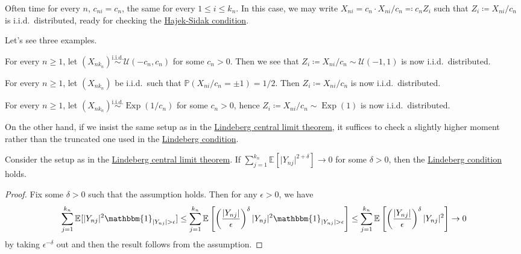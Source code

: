 \begin{intuition}
	Often time for every \(n\), \(c_{ni} = c_n\), the same for every \(1 \leq i \leq k_n\). In this case, we may write \(X_{n i} = c_n \cdot X_{ni} / c_n \eqqcolon c_n Z_i\) such that \(Z_i \coloneqq X_{ni} / c_n\) is i.i.d.\ distributed, ready for checking the \hyperref[thm:Hajek-Sidak-CLT]{Hajek-Sidak condition}.
\end{intuition}

Let's see three examples.

\begin{eg}
	For every \(n \geq 1\), let \((X_{n k_n}) \overset{\text{i.i.d.} }{\sim } \mathcal{U} (-c_n, c_n)\) for some \(c_n > 0\). Then we see that \(Z_i \coloneqq X_{n i} / c_n \sim \mathcal{U} (-1, 1)\) is now i.i.d.\ distributed.
\end{eg}

\begin{eg}
	For every \(n \geq 1\), let \((X_{n k_n})\) be i.i.d.\ such that \(\mathbb{P} (X_{ni} / c_n = \pm 1) = 1 / 2\). Then \(Z_i \coloneqq X_{ni} / c_n\) is now i.i.d.\ distributed.
\end{eg}

\begin{eg}
	For every \(n \geq 1\), let \((X_{n k_n}) \overset{\text{i.i.d.} }{\sim } \operatorname{Exp}(1 / c_n) \) for some \(c_n > 0\), hence \(Z_i \coloneqq X_{ni} / c_n \sim \operatorname{Exp}(1) \) is now i.i.d.\ distributed.
\end{eg}

On the other hand, if we insist the same setup as in the \hyperref[thm:Lindeberg-CLT]{Lindeberg central limit theorem}, it suffices to check a slightly higher moment rather than the truncated one used in the \hyperref[def:Lindeberg-condition]{Lindeberg condition}.

\begin{corollary}\label{thm:Lyapunov-CLT}
	Consider the setup as in the \hyperref[thm:Lindeberg-CLT]{Lindeberg central limit theorem}. If \(\sum_{j=1}^{k_n} \mathbb{E}_{}[\vert Y_{nj} \vert ^{2 + \delta }] \to 0\) for some \(\delta > 0\), then the \hyperref[def:Lindeberg-condition]{Lindeberg condition} holds.
\end{corollary}
\begin{proof}
	Fix some \(\delta > 0\) such that the assumption holds. Then for any \(\epsilon > 0\), we have
	\[
		\sum_{j=1}^{k_n} \mathbb{E}_{}[\vert Y_{nj} \vert ^2 \mathbbm{1}_{\vert Y_{nj} \vert > \epsilon } ]
		\leq \sum_{j=1}^{k_n} \mathbb{E}_{}\left[ \left( \frac{\vert Y_{nj} \vert }{\epsilon } \right) ^\delta \vert Y_{nj} \vert ^2 \mathbbm{1}_{\vert Y_{nj} \vert > \epsilon } \right]
		\leq \sum_{j=1}^{k_n} \mathbb{E}_{}\left[ \left( \frac{\vert Y_{nj} \vert }{\epsilon } \right) ^\delta \vert Y_{nj} \vert ^2 \right]
		\to 0
	\]
	by taking \(\epsilon ^{-\delta }\) out and then the result follows from the assumption.
\end{proof}

